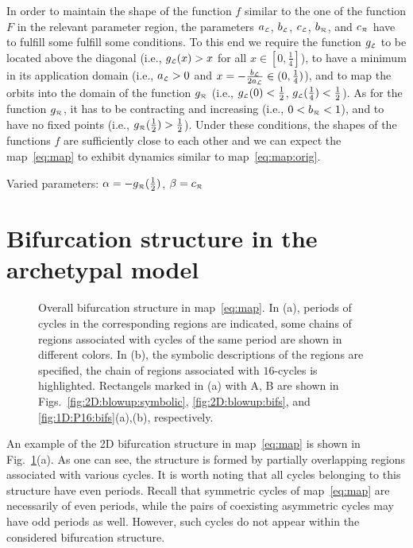 \documentclass[10pt]{article}
\newif\ifFigs       \Figsfalse
\renewcommand{\l}{\text{\tiny $\mathcal L$}}
\renewcommand{\r}{\text{\tiny $\mathcal R$}}
\newcommand{\gR}{g_\r}
\newcommand{\gL}{g_\l}
\newcommand{\aL}{a_\l}
\newcommand{\bR}{b_\r}
\newcommand{\bL}{b_\l}
\newcommand{\cR}{c_\r}
\newcommand{\cL}{c_\l}
\newcommand{\Includegraphics}[2]%
           {\centering
             \ifFigs\texttt{[image: \#2]}%
             \else  \texttt{[image: \#2]}\fi}
\newcommand{\Includesubgraphics}[3]%
{\begin{minipage}[b]{#1}
    \Includegraphics{\textwidth}{#2}\\
    \centerline{{\footnotesize (#3)}}
  \end{minipage}
}
\begin{document}
In order to maintain the shape of the function $f$ similar to the one
of the function $F$ in the relevant parameter region, the parameters
$\aL$, $\bL$, $\cL$, $\bR$, and $\cR$ have to fulfill some fulfill
some conditions. To this end we require the function $\gL$ to be
located above the diagonal (i.e., $\gL(x)>x$ for all $x\in [0,
		\frac{1}{4}]$), to have a minimum in its application domain (i.e.,
$\aL>0$ and $x=-\frac{\bL}{2\aL} \in (0, \frac{1}{4})$), and to map
the orbits into the domain of the function $\gR$ (i.e.,
$\gL(0)<\frac{1}{2}$, $\gL(\frac{1}{4})<\frac{1}{2}$).  As for the
function $\gR$, it has to be contracting and increasing (i.e., $0 <
	\bR < 1$), and to have no fixed points (i.e.,
$\gR(\frac{1}{2})>\frac{1}{2}$).  Under these conditions, the shapes of
the functions $f$ are sufficiently close to each other and we can
expect the map~\eqref{eq:map} to exhibit dynamics similar to
map~\eqref{eq:map:orig}.


Varied parameters: $\alpha=-\gR(\frac{1}{2})$, $\beta=\cR$

\clearpage
\section{Bifurcation structure in the archetypal model}

\begin{figure}[t]
	\caption{\label{fig:2D:overall}Overall bifurcation structure in
		map~\eqref{eq:map}.  In (a), periods of cycles in the
		corresponding regions are indicated, some chains of regions
		associated with cycles of the same period are shown in different
		colors.  In (b), the symbolic descriptions of the regions are
		specified, the chain of regions associated with $16$-cycles is
		highlighted. Rectangels marked in (a) with A, B are shown in
		Figs.~\ref{fig:2D:blowup:symbolic}, \ref{fig:2D:blowup:bifs}, and
		\ref{fig:1D:P16:bifs}(a),(b), respectively.
	}
\end{figure}




An example of the 2D bifurcation structure in map~\eqref{eq:map} is
shown in Fig.~\ref{fig:2D:overall}(a).  As one can see, the structure is
formed by partially overlapping regions associated with various
cycles.  It is worth noting that all cycles belonging to this
structure have even periods. Recall that symmetric cycles of
map~\eqref{eq:map} are necessarily of even periods, while the pairs of
coexisting asymmetric cycles may have odd periods as well.  However,
such cycles do not appear within the considered bifurcation structure.
\end{document}

